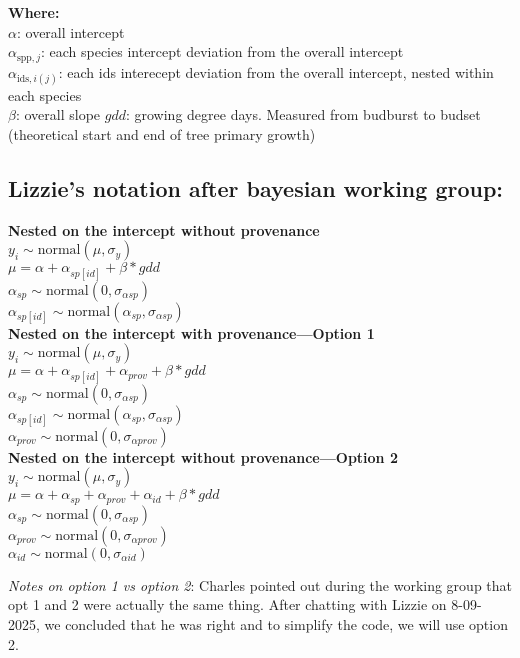 \documentclass[a4paper,12pt]{article}
\begin{document}
\textbf{Where:} \\ 
$\alpha$: overall intercept \\ 
$\alpha_{\text{spp}, j}$: each species intercept deviation from the overall intercept\\ 
$\alpha_{\text{ids}, i(j)}$: each ids interecept deviation from the overall intercept, nested within each species\\
$\beta$: overall slope
$gdd$: growing degree days. Measured from budburst to budset (theoretical start and end of tree primary growth)

\subsection*{Lizzie's notation after bayesian working group:}
\textbf{Nested on the intercept without provenance}\\
$ y_i \sim \text{normal}(\mu, \sigma_y)$\\
$ \mu =  \alpha + \alpha_{sp[id]} + \beta*gdd$\\
$ \alpha_{sp} \sim \text{normal}(0, \sigma_{\alpha sp})$\\
$ \alpha_{sp[id]} \sim \text{normal}(\alpha_{sp}, \sigma_{\alpha sp})$ \\

\textbf{Nested on the intercept with provenance---Option 1}\\
$ y_i \sim \text{normal}(\mu, \sigma_y)$\\
$ \mu =  \alpha + \alpha_{sp[id]} + \alpha_{prov} + \beta*gdd$\\
$ \alpha_{sp} \sim \text{normal}(0, \sigma_{\alpha sp})$\\
$ \alpha_{sp[id]} \sim \text{normal}(\alpha_{sp}, \sigma_{\alpha sp})$\\
$ \alpha_{prov} \sim \text{normal}(0, \sigma_{\alpha prov})$ \\

\textbf{Nested on the intercept without provenance---Option 2}\\
$ y_i \sim \text{normal}(\mu, \sigma_y)$\\
$ \mu =  \alpha + \alpha_{sp} + \alpha_{prov} + \alpha_{id} +  \beta*gdd$\\
$ \alpha_{sp} \sim \text{normal}(0, \sigma_{\alpha sp})$\\
$ \alpha_{prov} \sim \text{normal}(0, \sigma_{\alpha prov})$\\
$ \alpha_{id} \sim \text{normal}(0, \sigma_{\alpha id})$

\textit{Notes on option 1 vs option 2}: Charles pointed out during the working group that opt 1 and 2 were actually the same thing. After chatting with Lizzie on 8-09-2025, we concluded that he was right and to simplify the code, we will use option 2.
\end{document}
